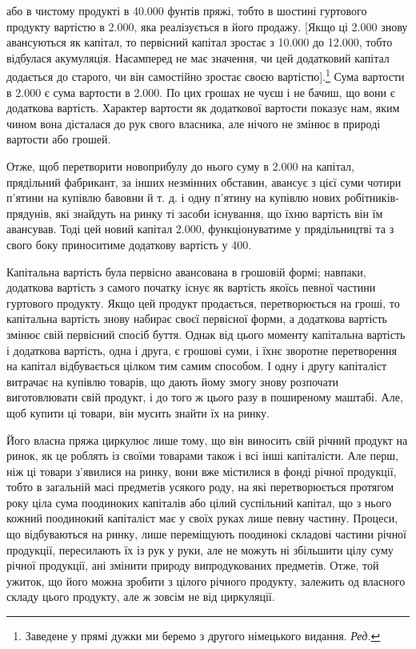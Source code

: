 \parcont{}  %
або в чистому продукті в 40.000 фунтів пряжі, тобто в шостині
гуртового продукту вартістю в 2.000, яка
реалізується в його продажу. [Якщо ці 2.000
знову авансуються як капітал, то первісний капітал зростає
з 10.000 до 12.000, тобто
відбулася акумуляція. Насамперед не має значення, чи цей додатковий
капітал додається до старого, чи він самостійно зростає
своєю вартістю].\footnote*{
Заведене у прямі дужки ми беремо з другого німецького видання.
\emph{Ред.}
} Сума вартости в 2.000 є сума
вартости в 2.000. По цих грошах не чуєш і не
бачиш, що вони є додаткова вартість. Характер вартости як додаткової
вартости показує нам, яким чином вона дісталася до
рук свого власника, але нічого не змінює в природі вартости
або грошей.

Отже, щоб перетворити новоприбулу до нього суму в 2.000 на капітал, прядільний фабрикант, за інших незмінних
обставин, авансує з цієї суми чотири п’ятини на купівлю
бавовни й т. д. і одну п’ятину на купівлю нових робітників-прядунів,
які знайдуть на ринку ті засоби існування, що їхню вартість
він їм авансував. Тоді цей новий капітал 2.000, функціонуватиме у прядільництві та з свого боку
приноситиме додаткову вартість у 400.

Капітальна вартість була первісно авансована в грошовій
формі; навпаки, додаткова вартість з самого початку існує як
вартість якоїсь певної частини гуртового продукту. Якщо цей
продукт продається, перетворюється на гроші, то капітальна
вартість знову набирає своєї первісної форми, а додаткова вартість
змінює свій первісний спосіб буття. Однак від цього моменту
капітальна вартість і додаткова вартість, одна і друга, є грошові
суми, і їхнє зворотне перетворення на капітал відбувається цілком
тим самим способом. І одну і другу капіталіст витрачає на
купівлю товарів, що дають йому змогу знову розпочати виготовлювати
свій продукт, і до того ж цього разу в поширеному
маштабі. Але, щоб купити ці товари, він мусить знайти їх на ринку.

Його власна пряжа циркулює лише тому, що він виносить
свій річний продукт на ринок, як це роблять із своїми товарами
також і всі інші капіталісти. Але перш, ніж ці товари з’явилися
на ринку, вони вже містилися в фонді річної продукції, тобто в
загальній масі предметів усякого роду, на які перетворюється
протягом року ціла сума поодиноких капіталів або цілий суспільний
капітал, що з нього кожний поодинокий капіталіст має
у своїх руках лише певну частину. Процеси, що відбуваються на
ринку, лише переміщують поодинокі складові частини річної
продукції, пересилають їх із рук у руки, але не можуть ні збільшити
цілу суму річної продукції, ані змінити природу випродукованих
предметів. Отже, той ужиток, що його можна зробити
з цілого річного продукту, залежить од власного складу цього
продукту, але ж зовсім не від циркуляції.
